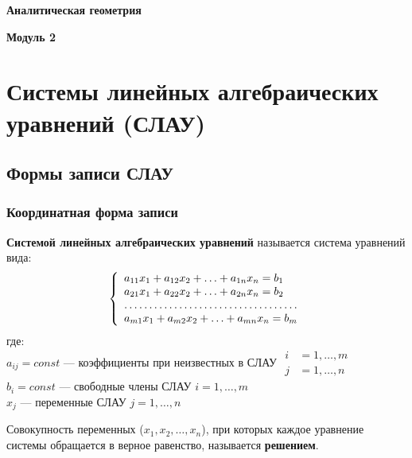 


\begin{center}
\Huge\textbf{Аналитическая геометрия}
\end{center}
\tableofcontents
\newpage


\newpage
\zerocounter

\newpage
\zerocounter

\newpage
\zerocounter

\newpage
\zerocounter

\newpage
\zerocounter
\begin{center}
\large{\textbf{Модуль 2}}
\end{center}

\newpage
\zerocounter

\newpage
\zerocounter
%
\section{Системы линейных алгебраических уравнений (СЛАУ)}
\subsection{Формы записи СЛАУ}
\subsubsection{Координатная форма записи}
\begin{definition}
\textbf{Системой линейных алгебраических уравнений} называется система уравнений вида:
\begin{align}
\left\{
\begin{array}{l}
a_{11}x_1 + a_{12}x_2 + \ldots + a_{1n}x_n = b_1 \\
a_{21}x_1 + a_{22}x_2 + \ldots + a_{2n}x_n = b_2 \\
\hdotsfor{1} \\
a_{m1}x_1 + a_{m2}x_2 + \ldots + a_{mn}x_n = b_m
\end{array} \right.
\end{align}
где:\\
$a_{ij} = const$ --- коэффициенты при неизвестных в СЛАУ \quad $\begin{aligned}
i&=1, \ldots, m\\[-3pt]
j&=1, \ldots, n
\end{aligned}$\\
$b_i = const$ --- свободные члены СЛАУ \quad $i=1,\ldots,m$\\
$x_j$ --- переменные СЛАУ \quad $j=1,\ldots,n$  %
\end{definition}
\begin{definition}
Совокупность переменных ($x_1, x_2, \ldots, x_n$), при которых каждое уравнение системы обращается в верное равенство, называется \textbf{решением}.
\end{definition}
